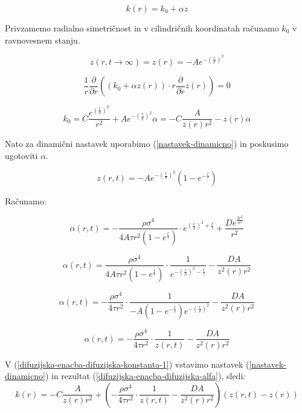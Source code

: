 \documentclass[a4paper, oneside, 12pt]{book}
\begin{document}
\begin{equation}
  k(r) = k_0 + \alpha z
  \label{difuzijska-enacba-difuzijska-konstanta-1}
\end{equation}

Privzamemo radialno simetričnost in v cilindričnih koordinatah računamo $k_0$ v ravnovesnem stanju.

\begin{equation}
  z(r,t \rightarrow\infty) = z(r) = -A e^{-(\frac{r}{\sigma})^2}
  \label{nastavek-ravnovesje}
\end{equation}

\begin{equation}
  \frac{1}{r} \frac{\partial}{\partial r} \left((k_0 + \alpha z(r)) \cdot r \frac{\partial}{\partial r} z(r) \right) = 0
  \label{difuzijska-enacba-2}
\end{equation}

\begin{equation}
  k_0 = C \frac{e^{(\frac{r}{\sigma})^2}}{r^2} + A e^{-(\frac{r}{\sigma})^2} \alpha = - C \frac{A}{z(r) r^2} - z(r) \alpha
  \label{difuzijska-enacba-difuzijska-konstanta-2}
\end{equation}

Nato za dinamični nastavek uporabimo (\ref{nastavek-dinamicno}) in poskusimo ugotoviti $\alpha$.

\begin{equation}
  z(r,t) = -A e^{-(\frac{r}{\sigma})^2} (1-e^{-\frac{t}{\tau}})
  \label{nastavek-dinamicno}
\end{equation}

Računamo:

\[
  \alpha(r,t) = - \frac{\rho \sigma^4}{4 A \tau r^2 (1-e^{\frac{t}{\tau}})} \cdot e^{(\frac{r}{\sigma})^2 + \frac{t}{\tau}} + \frac{D e^{\frac{2r^2}{\sigma^2}}}{r^2}
\]

\[
  \alpha(r,t) = \frac{\rho \sigma^4}{4 A \tau r^2 (1-e^{\frac{t}{\tau}})} \cdot \frac{1}{e^{-(\frac{r}{\sigma})^2 - \frac{t}{\tau}}} - \frac{D A}{z^2(r) r^2}
\]

\[
  \alpha(r,t) = -\frac{\rho \sigma^4}{4 \tau r^2} \cdot \frac{1}{-A (1-e^{-\frac{t}{\tau}}) e^{-(\frac{r}{\sigma})^2 }} - \frac{D A}{z^2(r) r^2}
\]

\begin{equation}
  \alpha(r,t) = -\frac{\rho \sigma^4}{4 \tau r^2} \cdot \frac{1}{z(r,t)} - \frac{D A}{z^2(r) r^2}
  \label{difuzijska-enacba-difuzijska-alfa}
\end{equation}

V (\ref{difuzijska-enacba-difuzijska-konstanta-1}) vstavimo nastavek (\ref{nastavek-dinamicno}) in rezultat (\ref{difuzijska-enacba-difuzijska-alfa}), sledi:
\[
  k(r) = - C \frac{A}{z(r) r^2} + \left(  -\frac{\rho \sigma^4}{4 \tau r^2} \cdot \frac{1}{z(r,t)} - \frac{D A}{z^2(r) r^2} \right) (z(r,t)-z(r))
\]
\end{document}
